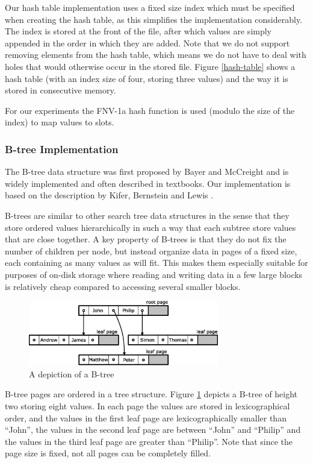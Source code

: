 \documentclass{acm_proc_article-sp}
\begin{document}
Our hash table implementation uses a fixed size index which must be specified
when creating the hash table, as this simplifies the implementation
considerably. The index is stored at the front of the file, after which values
are simply appended in the order in which they are added. Note that we do not
support removing elements from the hash table, which means we do not have to
deal with holes that would otherwise occur in the stored file.
Figure \ref{hash-table} shows a hash table (with an index size of four,
storing three values) and the way it is stored in consecutive memory.

For our
experiments the FNV-1a hash function \cite{noll2004fnv} is used (modulo the
size of the index) to map values to slots.

\subsubsection{B-tree Implementation}
The B-tree data structure was first proposed by Bayer and McCreight
\cite{bayer1970oam} and is widely implemented and often described in
textbooks. Our implementation is based on the description by Kifer, Bernstein
and Lewis \cite{kifer2006dsa}.

B-trees are similar to other search tree data structures in the sense that
they store ordered values hierarchically in such a way that each subtree store
values that are close together.
A key property of B-trees is that they do not fix the number of children per node, but instead organize data in pages of a fixed size, each containing
as many values as will fit. This makes them especially suitable for purposes
of on-disk storage where reading and writing data in a few large blocks is
relatively cheap compared to accessing several smaller blocks.

\begin{figure}
\centering
\includegraphics[width=83mm]{b-tree}
\caption{A depiction of a B-tree}
\label{fig-b-tree}
\end{figure}

B-tree pages are ordered in a tree structure. Figure \ref{fig-b-tree} depicts a
B-tree of height two storing eight values.
In each page the values are stored in lexicographical order, and the values
in the first leaf page are lexicographically smaller than ``John'', the values
in the second leaf page are between ``John'' and ``Philip'' and the values in
the third leaf page are greater than ``Philip''. Note that since the page
size is fixed, not all pages can be completely filled.
\end{document}
